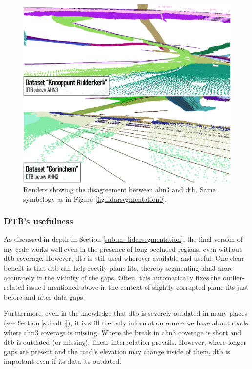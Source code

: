 \begin{figure}[h]
    \centering
    \includegraphics[width=0.9\linewidth]{final_report/figs/lidarsegmentation1.png}
    \caption[Renders showing the disagreement between AHN3 and DTB]{Renders showing the disagreement between \ac{ahn3} and \ac{dtb}. Same symbology as in Figure \ref{fig:lidarsegmentation0}.}
    \label{fig:lidarsegmentation1}
\end{figure}

\subsubsection{DTB's usefulness}

As discussed in-depth in Section \ref{sub:m_lidarsegmentation}, the final version of my code works well even in the presence of long occluded regions, even without \ac{dtb} coverage. However, \ac{dtb} is still used wherever available and useful. One clear benefit is that \ac{dtb} can help rectify plane fits, thereby segmenting \ac{ahn3} more accurately in the vicinity of the gaps. Often, this automatically fixes the outlier-related issue I mentioned above in the context of slightly corrupted plane fits just before and after data gaps.

Furthermore, even in the knowledge that \ac{dtb} is severely outdated in many places (see Section \ref{sub:dtb}), it is still the only information source we have about roads where \ac{ahn3} coverage is missing. Where the break in \ac{ahn3} coverage is short and \ac{dtb} is outdated (or missing), linear interpolation prevails. However, where longer gaps are present and the road's elevation may change inside of them, \ac{dtb} is important even if its data its outdated.

